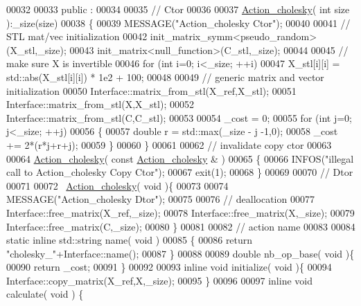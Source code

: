 \begin{DoxyCode}
00032 
00033 public :
00034 
00035   \textcolor{comment}{// Ctor}
00036 
00037   \hyperlink{class_action__cholesky}{Action\_cholesky}( \textcolor{keywordtype}{int} size ):\_size(size)
00038   \{
00039     MESSAGE(\textcolor{stringliteral}{"Action\_cholesky Ctor"});
00040 
00041     \textcolor{comment}{// STL mat/vec initialization}
00042     init\_matrix\_symm<pseudo\_random>(X\_stl,\_size);
00043     init\_matrix<null\_function>(C\_stl,\_size);
00044 
00045     \textcolor{comment}{// make sure X is invertible}
00046     \textcolor{keywordflow}{for} (\textcolor{keywordtype}{int} i=0; i<\_size; ++i)
00047       X\_stl[i][i] = std::abs(X\_stl[i][i]) * 1e2 + 100;
00048 
00049     \textcolor{comment}{// generic matrix and vector initialization}
00050     Interface::matrix\_from\_stl(X\_ref,X\_stl);
00051     Interface::matrix\_from\_stl(X,X\_stl);
00052     Interface::matrix\_from\_stl(C,C\_stl);
00053 
00054     \_cost = 0;
00055     \textcolor{keywordflow}{for} (\textcolor{keywordtype}{int} j=0; j<\_size; ++j)
00056     \{
00057       \textcolor{keywordtype}{double} r = std::max(\_size - j -1,0);
00058       \_cost += 2*(r*j+r+j);
00059     \}
00060   \}
00061 
00062   \textcolor{comment}{// invalidate copy ctor}
00063 
00064   \hyperlink{class_action__cholesky}{Action\_cholesky}( \textcolor{keyword}{const}  \hyperlink{class_action__cholesky}{Action\_cholesky} & )
00065   \{
00066     INFOS(\textcolor{stringliteral}{"illegal call to Action\_cholesky Copy Ctor"});
00067     exit(1);
00068   \}
00069 
00070   \textcolor{comment}{// Dtor}
00071 
00072   ~\hyperlink{class_action__cholesky}{Action\_cholesky}( \textcolor{keywordtype}{void} )\{
00073 
00074     MESSAGE(\textcolor{stringliteral}{"Action\_cholesky Dtor"});
00075 
00076     \textcolor{comment}{// deallocation}
00077     Interface::free\_matrix(X\_ref,\_size);
00078     Interface::free\_matrix(X,\_size);
00079     Interface::free\_matrix(C,\_size);
00080   \}
00081 
00082   \textcolor{comment}{// action name}
00083 
00084   \textcolor{keyword}{static} \textcolor{keyword}{inline} std::string name( \textcolor{keywordtype}{void} )
00085   \{
00086     \textcolor{keywordflow}{return} \textcolor{stringliteral}{"cholesky\_"}+Interface::name();
00087   \}
00088 
00089   \textcolor{keywordtype}{double} nb\_op\_base( \textcolor{keywordtype}{void} )\{
00090     \textcolor{keywordflow}{return} \_cost;
00091   \}
00092 
00093   \textcolor{keyword}{inline} \textcolor{keywordtype}{void} initialize( \textcolor{keywordtype}{void} )\{
00094     Interface::copy\_matrix(X\_ref,X,\_size);
00095   \}
00096 
00097   \textcolor{keyword}{inline} \textcolor{keywordtype}{void} calculate( \textcolor{keywordtype}{void} ) \{

\end{DoxyCode}
